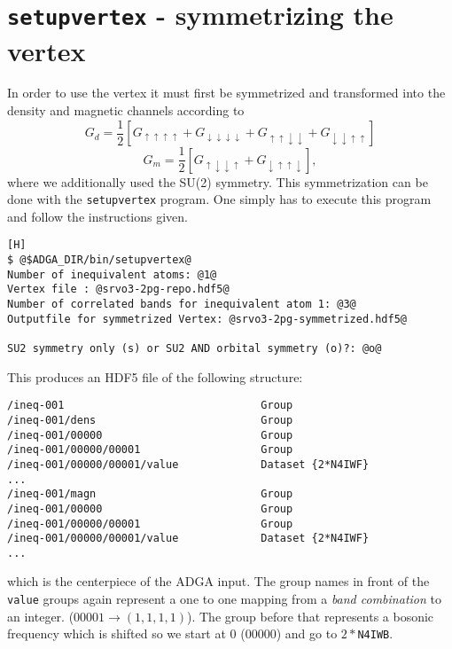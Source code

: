 \documentclass[a4paper,11pt]{article}
\numberwithin{equation}{section} %
\begin{document}
\newpage
\section{\protect\Verb+setupvertex+ - symmetrizing the vertex}
In order to use the vertex it must first be symmetrized and transformed into the density and magnetic channels according to
\begin{equation*}
G_d = \frac{1}{2}\left[G_{\uparrow\uparrow\uparrow\uparrow} + G_{\downarrow\downarrow\downarrow\downarrow} + G_{\uparrow\uparrow\downarrow\downarrow} + G_{\downarrow\downarrow\uparrow\uparrow} \right]
\end{equation*}
\begin{equation*}
G_m = \frac{1}{2}\left[G_{\uparrow\downarrow\downarrow\uparrow} + G_{\downarrow\uparrow\uparrow\downarrow} \right],
\end{equation*}
where we additionally used the SU(2) symmetry.
%
This symmetrization can be done with the \verb|setupvertex| program. One simply has to execute this program and follow the instructions given.
\begin{lstlisting}[caption=exemplary setupvertex execution, frame=single, basicstyle=\small, style=base][H]
$ @$ADGA_DIR/bin/setupvertex@
Number of inequivalent atoms: @1@
Vertex file : @srvo3-2pg-repo.hdf5@
Number of correlated bands for inequivalent atom 1: @3@
Outputfile for symmetrized Vertex: @srvo3-2pg-symmetrized.hdf5@
 
SU2 symmetry only (s) or SU2 AND orbital symmetry (o)?: @o@
\end{lstlisting}
This produces an HDF5 file of the following structure:
\begin{lstlisting}[caption=symmetrized vertex structure, frame=single, basicstyle=\small]
/ineq-001                               Group
/ineq-001/dens                          Group
/ineq-001/00000                         Group
/ineq-001/00000/00001                   Group
/ineq-001/00000/00001/value             Dataset {2*N4IWF}
...
/ineq-001/magn                          Group
/ineq-001/00000                         Group
/ineq-001/00000/00001                   Group
/ineq-001/00000/00001/value             Dataset {2*N4IWF}
...
\end{lstlisting}

which is the centerpiece of the ADGA input. The group names in front of the \verb|value| groups again represent a one to one mapping from a  \emph{band combination} to an integer. ($00001 \rightarrow (1,1,1,1)$). The group before that represents a bosonic frequency which is shifted so we start at 0 (00000) and go to $2\ast$\verb|N4IWB|.
\end{document}
